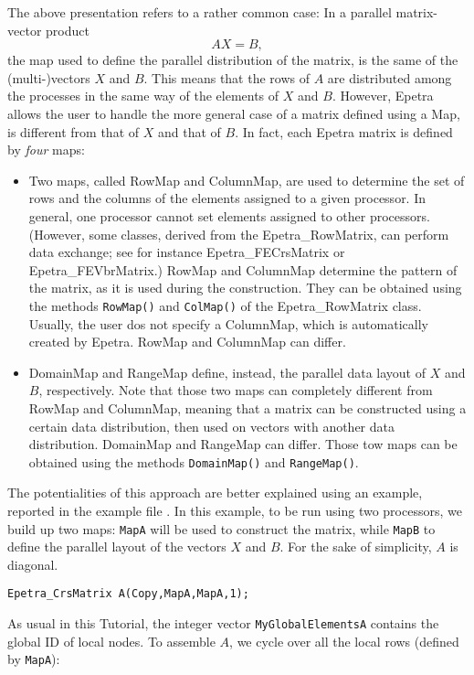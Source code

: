 The above presentation refers to a rather common case: In a parallel
matrix-vector product
\[
A X = B ,
\]
the map used to define the parallel distribution of the matrix, is the
same of the (multi-)vectors $X$ and $B$.  This means that the rows of
$A$ are distributed among the processes in the same way of the elements
of $X$ and $B$.  However, Epetra allows the user to handle the more
general case of a matrix defined using a Map, is different from that of
$X$ and that of $B$. In fact, each Epetra matrix is defined by {\sl
  four} maps:
\begin{itemize}
\item Two maps, called RowMap and ColumnMap, are used to determine the
  set of rows and the columns of the elements assigned to a given
  processor. In general, one processor cannot set elements assigned to
  other processors.  (However, some classes, derived from the
  Epetra\_RowMatrix, can perform data exchange; see for instance
  Epetra\_FECrsMatrix or Epetra\_FEVbrMatrix.) RowMap and ColumnMap
  determine the pattern of the matrix, as it is used during the
  construction. They can be obtained using the methods \verb!RowMap()!
  and \verb!ColMap()! of the Epetra\_RowMatrix class. Usually, the user
  dos not specify a ColumnMap, which is automatically created by Epetra.
  RowMap and ColumnMap can differ.
\item DomainMap and RangeMap define, instead, the parallel data layout
  of $X$ and $B$, respectively. Note that those two maps can completely
  different from RowMap and ColumnMap, meaning that a matrix can be
  constructed using a certain data distribution, then used on vectors
  with another data distribution. DomainMap and RangeMap can
  differ. Those tow maps can be obtained using the methods
  \verb!DomainMap()! and \verb!RangeMap()!.
\end{itemize}
The potentialities of this approach are better explained using an
example, reported in the example file . In this
example, to be run using two processors, we build up two maps:
\verb!MapA! will be used to construct the matrix, while \verb!MapB! to
define the parallel layout of the vectors $X$ and $B$. For the sake of
simplicity, $A$ is diagonal.
\begin{verbatim}
Epetra_CrsMatrix A(Copy,MapA,MapA,1);
\end{verbatim}
As usual in this Tutorial, the integer vector \verb!MyGlobalElementsA!
contains the global ID of local nodes. To assemble $A$, we cycle over
all the local rows (defined by \verb!MapA!):
